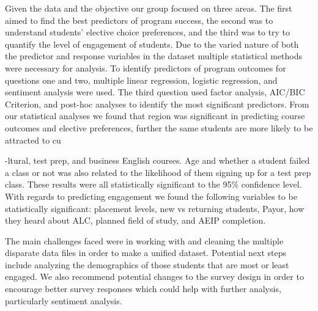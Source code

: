 \documentclass[12pt,letterpaper]{article}
\begin{document}
\begin{titlepage}
Given the data and the objective our group focused on three areas. The first aimed to find the best predictors of program success, the second was to understand students' elective choice preferences, and the third was to try to quantify the level of engagement of students. Due to the varied nature of both the predictor and response variables in the dataset multiple statistical methods were necessary for analysis. To identify predictors of program outcomes for questions one and two, multiple linear regression, logistic regression, and sentiment analysis were used. The third question used factor analysis, AIC/BIC Criterion, and post-hoc analyses to identify the most significant predictors.
From our statistical analyses we found that region was significant in predicting course outcomes and elective preferences, further the same students are more likely to be attracted to cu \end{titlepage}-ltural, test prep, and business English courses. Age and whether a student failed a class or not was also related to the likelihood of them signing up for a test prep class. These results were all statistically significant to the 95\% confidence level. With regards to predicting engagement we found the following variables to be statistically significant: placement levels, new vs returning students, Payor, how they heard about ALC, planned field of study, and AEIP completion.

The main challenges faced were in working with and cleaning the multiple disparate data files in order to make a unified dataset. Potential next steps include analyzing the demographics of those students that are most or least engaged. We also recommend potential changes to the survey design in order to encourage better survey responses which could help with further analysis, particularly sentiment analysis.



\setcounter{page}{1}


\end{document}
